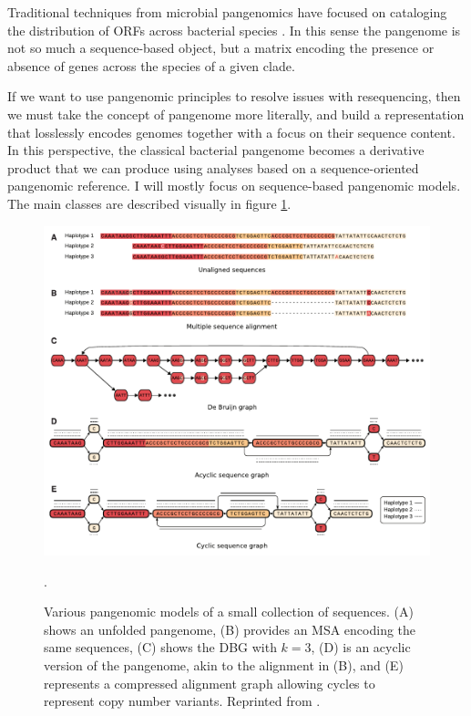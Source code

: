 \documentclass[a4paper,12pt,numbered,oneside]{Classes/PhDThesisPSnPDF}
\begin{document}
Traditional techniques from microbial pangenomics have focused on cataloging the distribution of ORFs across bacterial species \cite{page2015roary}.
In this sense the pangenome is not so much a sequence-based object, but a matrix encoding the presence or absence of genes across the species of a given clade.

If we want to use pangenomic principles to resolve issues with resequencing, then we must take the concept of pangenome more literally, and build a representation that losslessly encodes genomes together with a focus on their sequence content.
In this perspective, the classical bacterial pangenome becomes a derivative product that we can produce using analyses based on a sequence-oriented pangenomic reference.
I will mostly focus on sequence-based pangenomic models.
The main classes are described visually in figure \ref{fig:pangenomic_models}.

\begin{figure}[htbp!]
  \centering
  \includegraphics[width=1.0\textwidth]{Chapter1/Figs/cpang_fig3.pdf}
  \caption[Pangenomic models]{
    Various pangenomic models of a small collection of sequences.
    (A) shows an unfolded pangenome,
    (B) provides an MSA encoding the same sequences,
    (C) shows the DBG with $k=3$,
    (D) is an acyclic version of the pangenome, akin to the alignment in (B),
    and (E) represents a compressed alignment graph allowing cycles to represent copy number variants. 
    Reprinted from \cite{computational2016computational}.
    }
  \label{fig:pangenomic_models}.
\end{figure}
\end{document}
